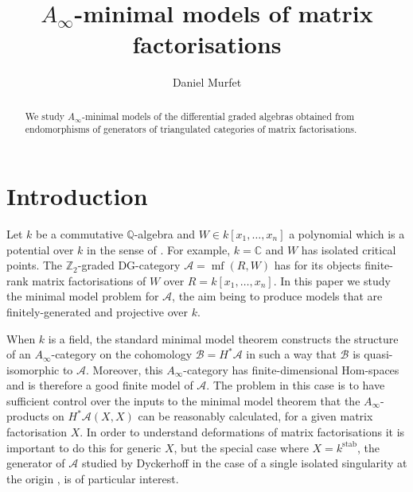 \documentclass[english,letter paper,12pt,leqno]{article}
\theoremstyle{example}
\numberwithin{equation}{section}
\def\res{\operatorname{Res}}
\def\stab{\operatorname{stab}}
\def\nZ{\mathds{Z}}
\begin{document}
\def\Res{\res\!}
\newcommand{\ud}{\mathrm{d}}
\newcommand{\Ress}[1]{\res_{#1}\!}
\newcommand{\cat}[1]{\mathcal{#1}}
\newcommand{\lto}{\longrightarrow}
\newcommand{\xlto}[1]{\stackrel{#1}\lto}
\newcommand{\mf}[1]{\mathfrak{#1}}
\newcommand{\md}[1]{\mathscr{#1}}
\def\sus{\l}
\def\l{\,|\,}
\def\sgn{\textup{sgn}}
\def\samp{\zeta}
\def\Samp{Z}
\def\traff{N}

\title{$A_\infty$-minimal models of matrix factorisations}
\author{Daniel Murfet}

\maketitle

\begin{abstract}
We study $A_\infty$-minimal models of the differential graded algebras obtained from endomorphisms of generators of triangulated categories of matrix factorisations.
\end{abstract}

\tableofcontents

\section{Introduction}

Let $k$ be a commutative $\mathbb{Q}$-algebra and $W \in k[x_1,\ldots,x_n]$ a polynomial which is a potential over $k$ in the sense of \cite[\S 2.2]{lgdual}. For example, $k = \mathbb{C}$ and $W$ has isolated critical points. The $\nZ_2$-graded DG-category $\cat{A} = \operatorname{mf}(R, W)$ has for its objects finite-rank matrix factorisations of $W$ over $R = k[x_1,\ldots,x_n]$. In this paper we study the minimal model problem for $\cat{A}$, the aim being to produce models that are finitely-generated and projective over $k$.

When $k$ is a field, the standard minimal model theorem \cite{??} constructs the structure of an $A_\infty$-category on the cohomology $\cat{B} = H^* \cat{A}$ in such a way that $\cat{B}$ is quasi-isomorphic to $\cat{A}$. Moreover, this $A_\infty$-category has finite-dimensional Hom-spaces and is therefore a good finite model of $\cat{A}$. The problem in this case is to have sufficient control over the inputs to the minimal model theorem that the $A_\infty$-products on $H^* \cat{A}(X,X)$ can be reasonably calculated, for a given matrix factorisation $X$. In order to understand deformations of matrix factorisations \cite{??,??,??} it is important to do this for generic $X$, but the special case where $X = k^{\stab}$, the generator of $\cat{A}$ studied by Dyckerhoff in the case of a single isolated singularity at the origin \cite{d0904.4713}, is of particular interest.
\end{document}

